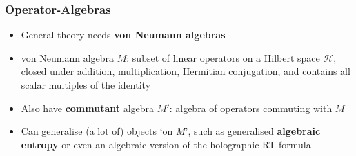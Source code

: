 \documentclass[11pt]{beamer}
\begin{document}
	\begin{frame}
		\frametitle{Operator-Algebras}
		\begin{itemize}[<+->]
			\item General theory needs \textbf{von Neumann algebras}
			\item von Neumann algebra $M$: subset of linear operators on a Hilbert space $\mathcal{H}$, closed under addition, multiplication, Hermitian conjugation, and contains all scalar multiples of the identity
			\item Also have \textbf{commutant} algebra $M'$: algebra of operators commuting with $M$
			\item Can generalise (a lot of) objects `on $M$', such as generalised \textbf{algebraic entropy} or even an algebraic version of the holographic RT formula
		\end{itemize}
	\end{frame}
	
\end{document}
